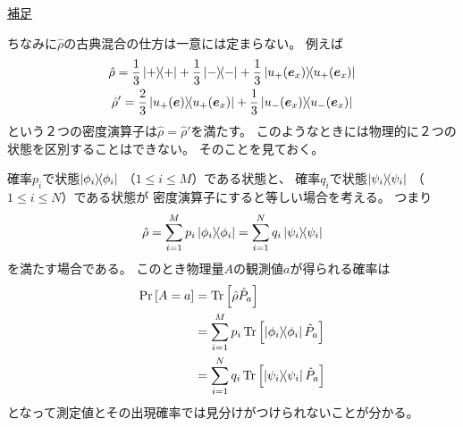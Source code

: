 \documentclass[a4paper, 10pt]{jsarticle}
\begin{document}
\begin{tcolorbox}[
enhanced,
colback = white,
boxrule = 0.5pt,
arc=2mm,
breakable
]
	\underline{補足}

	ちなみに$\hat{\rho}$の古典混合の仕方は一意には定まらない。
	例えば
	\begin{gather}
		\hat{\rho}
		= \frac{1}{3} \Ketbra{+}{+} + \frac{1}{3} \Ketbra{-}{-}
		+ \frac{1}{3} \Ketbra{u_+(\vec{e}_x)}{u_+(\vec{e}_x)} \\
		\hat{\rho}'
		= \frac{2}{3}  \Ketbra{u_+(\vec{e})}{u_+(\vec{e}_x)}
		+ \frac{1}{3} \Ketbra{u_-(\vec{e}_x)}{u_-(\vec{e}_x)}
	\end{gather}
	という２つの密度演算子は$\hat{\rho} = \hat{\rho}'$を満たす。
	このようなときには物理的に２つの状態を区別することはできない。
	そのことを見ておく。

	確率$p_i$で状態$\Ket{\phi_i} \! \! \Bra{\phi_i}$
	（$1 \leq i \leq M$）である状態と、
	確率$q_i$で状態$\Ket{\psi_i} \! \! \Bra{\psi_i}$
	（$1 \leq i \leq N$）である状態が
	密度演算子にすると等しい場合を考える。
	つまり
	\begin{align}
		\hat{\rho}
		= \sum_{i=1}^M p_i \Ket{\phi_i} \! \! \Bra{\phi_i}
		= \sum_{i=1}^N q_i \Ket{\psi_i} \! \! \Bra{\psi_i}
	\end{align}
	を満たす場合である。
	このとき物理量$A$の観測値$a$が得られる確率は
	\begin{align}
		\Pr \left[ A = a \right]
		&= \operatorname*{Tr} \left[ \hat{\rho} \hat{P}_a \right] \\
		&= \sum_{i=1}^M p_i
		\operatorname*{Tr} \left[ \Ket{\phi_i} \! \! \Bra{\phi_i} \hat{P}_a \right] \\
		&= \sum_{i=1}^N q_i
		\operatorname*{Tr} \left[ \Ket{\psi_i} \! \! \Bra{\psi_i} \hat{P}_a \right]
	\end{align}
	となって測定値とその出現確率では見分けがつけられないことが分かる。
\end{tcolorbox}
\end{document}

